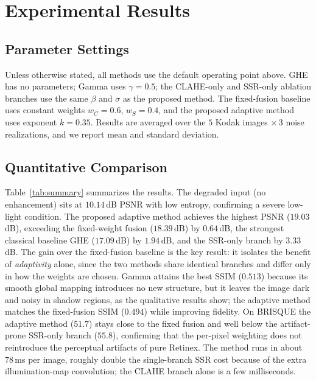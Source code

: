 \documentclass[conference,a4paper]{IEEEtran}
\begin{document}
\section{Experimental Results}
\label{sec:results}

\subsection{Parameter Settings}
Unless otherwise stated, all methods use the default operating point above.
GHE has no parameters; Gamma uses $\gamma=0.5$; the CLAHE-only and SSR-only
ablation branches use the same $\beta$ and $\sigma$ as the proposed method. The
fixed-fusion baseline uses constant weights $w_C=0.6$, $w_S=0.4$, and the
proposed adaptive method uses exponent $k=0.35$. Results are averaged over the
$5$ Kodak images $\times\,3$ noise realizations, and we report mean and standard
deviation.

\subsection{Quantitative Comparison}
Table~\ref{tab:summary} summarizes the results. The degraded input (no
enhancement) sits at $10.14$\,dB PSNR with low entropy, confirming a severe
low-light condition. The proposed adaptive method achieves the highest PSNR
($19.03$\,dB), exceeding the fixed-weight fusion ($18.39$\,dB) by $0.64$\,dB,
the strongest classical baseline GHE ($17.09$\,dB) by $1.94$\,dB, and the
SSR-only branch by $3.33$\,dB. The gain over the fixed-fusion baseline is the
key result: it isolates the benefit of \emph{adaptivity} alone, since the two
methods share identical branches and differ only in how the weights are chosen.
Gamma attains the best SSIM ($0.513$) because its smooth global mapping
introduces no new structure, but it leaves the image dark and noisy in shadow
regions, as the qualitative results show; the adaptive method matches the
fixed-fusion SSIM ($0.494$) while improving fidelity. On BRISQUE the adaptive
method ($51.7$) stays close to the fixed fusion and well below the artifact-prone
SSR-only branch ($55.8$), confirming that the per-pixel weighting does not
reintroduce the perceptual artifacts of pure Retinex. The method runs in about
$78$\,ms per image, roughly double the single-branch SSR cost because of the
extra illumination-map convolution; the CLAHE branch alone is a few
milliseconds.
\end{document}
